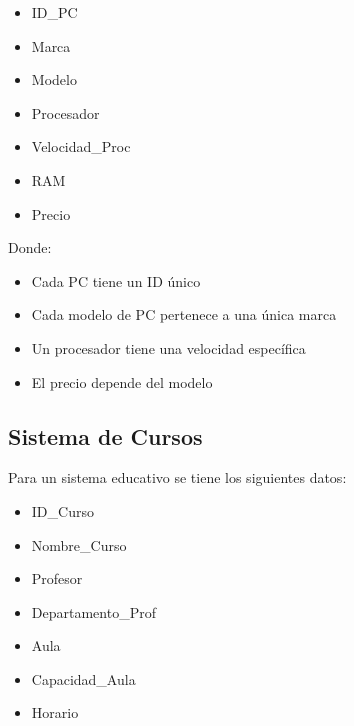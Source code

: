 \documentclass[12pt]{article}
\begin{document}
\vspace{0.5em}

\begin{minipage}[t]{0.48\textwidth}
\begin{itemize}
    \item ID\_PC
    \item Marca
    \item Modelo
    \item Procesador
\end{itemize}
\end{minipage}
\begin{minipage}[t]{0.48\textwidth}
\begin{itemize}
    \item Velocidad\_Proc
    \item RAM
    \item Precio
\end{itemize}
\end{minipage}

\vspace{1em}

Donde:
\begin{itemize}
    \item Cada PC tiene un ID único
    \item Cada modelo de PC pertenece a una única marca
    \item Un procesador tiene una velocidad específica
    \item El precio depende del modelo
\end{itemize}

\subsection{Sistema de Cursos}
Para un sistema educativo se tiene los siguientes datos:
\vspace{0.5em}

\begin{minipage}[t]{0.48\textwidth}
\begin{itemize}
    \item ID\_Curso 
    \item Nombre\_Curso
    \item Profesor
    \item Departamento\_Prof
\end{itemize}
\end{minipage}
\hfill
\begin{minipage}[t]{0.48\textwidth}
\begin{itemize}
    \item Aula
    \item Capacidad\_Aula
    \item Horario
\end{itemize}
\end{minipage}
\end{document}
